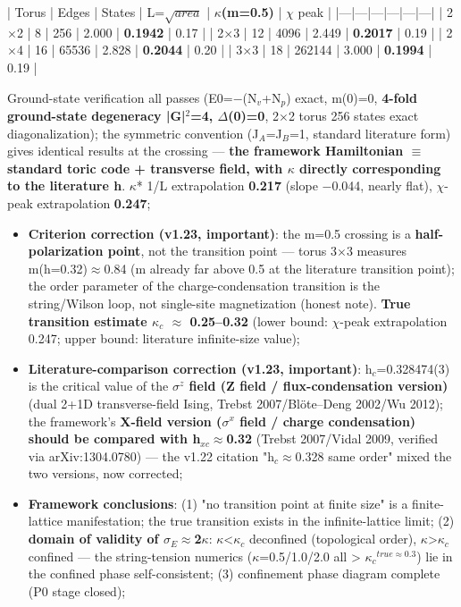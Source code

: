 \documentclass[12pt]{article}
\newcommand{\up}[1]{\ensuremath{^{#1}}}
\newcommand{\down}[1]{\ensuremath{_{#1}}}
\begin{document}
    | Torus | Edges | States | L=\ensuremath{\sqrt{area}} | \textbf{\ensuremath{\kappa}\*(m=0.5)} | \ensuremath{\chi} peak |
    |---|---|---|---|---|---|
    | 2\ensuremath{\times}2 | 8 | 256 | 2.000 | \textbf{0.1942} | 0.17 |
    | 2\ensuremath{\times}3 | 12 | 4096 | 2.449 | \textbf{0.2017} | 0.19 |
    | 2\ensuremath{\times}4 | 16 | 65536 | 2.828 | \textbf{0.2044} | 0.20 |
    | 3\ensuremath{\times}3 | 18 | 262144 | 3.000 | \textbf{0.1994} | 0.19 |

    Ground-state verification all passes (E0=\ensuremath{-}(N\down{v}+N\down{p}) exact, m(0)=0, \textbf{4-fold ground-state degeneracy |G|\up{2}=4, \ensuremath{\Delta}(0)=0}, 2\ensuremath{\times}2 torus 256 states exact diagonalization); the symmetric convention (J\down{A}=J\down{B}=1, standard literature form) gives identical results at the crossing --- \textbf{the framework Hamiltonian \ensuremath{\equiv} standard toric code + transverse field, with \ensuremath{\kappa} directly corresponding to the literature h}. \ensuremath{\kappa}* 1/L extrapolation \textbf{0.217} (slope \ensuremath{-}0.044, nearly flat), \ensuremath{\chi}-peak extrapolation \textbf{0.247};
\begin{itemize}
\item \textbf{Criterion correction (v1.23, important)}: the m=0.5 crossing is a \textbf{half-polarization point}, not the transition point --- torus 3\ensuremath{\times}3 measures m(h=0.32)\ensuremath{\approx}0.84 (m already far above 0.5 at the literature transition point); the order parameter of the charge-condensation transition is the string/Wilson loop, not single-site magnetization (honest note). \textbf{True transition estimate \ensuremath{\kappa}\down{c} \ensuremath{\approx} 0.25--0.32} (lower bound: \ensuremath{\chi}-peak extrapolation 0.247; upper bound: literature infinite-size value);
\item \textbf{Literature-comparison correction (v1.23, important)}: h\down{c}=0.328474(3) is the critical value of the \textbf{\ensuremath{\sigma}\up{z} field (Z field / flux-condensation version)} (dual 2+1D transverse-field Ising, Trebst 2007/Bl\"{o}te--Deng 2002/Wu 2012); the framework's \textbf{X-field version (\ensuremath{\sigma}\up{x} field / charge condensation) should be compared with h\down{xc}\ensuremath{\approx}0.32} (Trebst 2007/Vidal 2009, verified via arXiv:1304.0780) --- the v1.22 citation "h\down{c}\ensuremath{\approx}0.328 same order" mixed the two versions, now corrected;
\item \textbf{Framework conclusions}: (1) "no transition point at finite size" is a finite-lattice manifestation; the true transition exists in the infinite-lattice limit; (2) \textbf{domain of validity of \ensuremath{\sigma}\down{E}\ensuremath{\approx}2\ensuremath{\kappa}}: \ensuremath{\kappa}<\ensuremath{\kappa}\down{c} deconfined (topological order), \ensuremath{\kappa}>\ensuremath{\kappa}\down{c} confined --- the string-tension numerics (\ensuremath{\kappa}=0.5/1.0/2.0 all > \ensuremath{\kappa}\down{c}\up{true\approx{}0.3}) lie in the confined phase \checkmark self-consistent; (3) confinement phase diagram complete (P0 stage closed);
\end{itemize}
\end{document}
